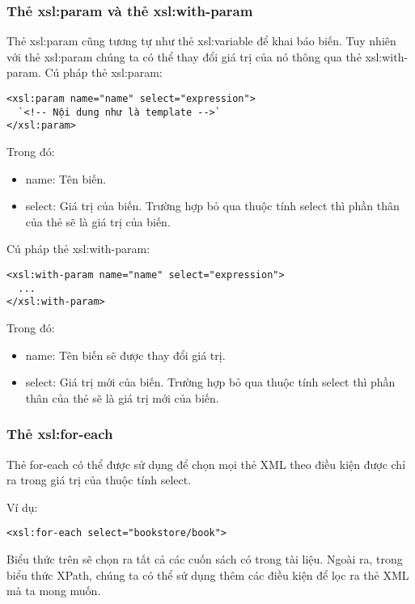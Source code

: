 \subsubsection {Thẻ xsl:param và thẻ xsl:with-param}
Thẻ {\ttfamily xsl:param} cũng tương tự như thẻ {\ttfamily xsl:variable} để khai báo biến. Tuy nhiên với thẻ {\ttfamily xsl:param} chúng ta có thể thay đổi giá trị của nó thông qua thẻ {\ttfamily xsl:with-param}. Cú pháp thẻ {\ttfamily xsl:param}:
\lstset{language=XML}
\begin{lstlisting}[escapechar=`]
<xsl:param name="name" select="expression">
  `<!-- Nội dung như là template -->`
</xsl:param>
\end{lstlisting}
Trong đó:
\begin{itemize}

\item {\ttfamily name}: Tên biến.

\item {\ttfamily select}: Giá trị của biến. Trường hợp bỏ qua thuộc tính {\ttfamily select} thì phần thân của thẻ sẽ là giá trị của biến.
\end{itemize} 
Cú pháp thẻ {\ttfamily xsl:with-param}:
\lstset{language=XML}
\begin{lstlisting}[escapechar=`]
<xsl:with-param name="name" select="expression">
  ...
</xsl:with-param>
\end{lstlisting}
Trong đó:
\begin{itemize}
\item {\ttfamily name}: Tên biến sẽ được thay đổi giá trị.

\item {\ttfamily select}: Giá trị mới của biến. Trường hợp bỏ qua thuộc tính {\ttfamily select} thì phần thân của thẻ sẽ là giá trị mới của biến.
\end{itemize}  
\subsubsection {Thẻ xsl:for-each}
Thẻ {\ttfamily for-each} có thể được sử dụng để chọn mọi thẻ XML theo điều kiện được chỉ ra trong giá trị của thuộc tính {\ttfamily select}.

Ví dụ:
\lstset{language=XML}
\begin{lstlisting}[escapechar=`]
	<xsl:for-each select="bookstore/book">
\end{lstlisting}

Biểu thức trên sẽ chọn ra tất cả các cuốn sách có trong tài liệu. Ngoài ra, trong biểu thức XPath, chúng ta có thể sử dụng thêm các điều kiện để lọc ra thẻ XML mà ta mong muốn. 

